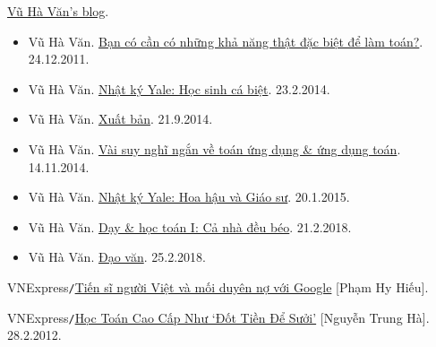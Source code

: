 \documentclass{article}
\numberwithin{equation}{section}
\begin{document}
\begin{thebibliography}{99}
	 \href{https://vuhavan.wordpress.com/}{Vũ Hà Văn's blog}.
	\begin{itemize}
		\item Vũ Hà Văn. \href{https://vuhavan.wordpress.com/2011/12/24/b%e1%ba%a1n-co-c%e1%ba%a7n-co-nh%e1%bb%afng-kh%e1%ba%a3-nang-th%e1%ba%adt-d%e1%ba%b7c-bi%e1%bb%87t-d%e1%bb%83-lam-toan/}{Bạn có cần có những khả năng thật đặc biệt để làm toán?}. 24.12.2011.
		\item Vũ Hà Văn. \href{https://vuhavan.wordpress.com/2014/02/23/nhat-ky-yale-hoc-sinh-ca-biet/}{Nhật ký Yale: Học sinh cá biệt}. 23.2.2014.
		\item Vũ Hà Văn. \href{https://vuhavan.wordpress.com/2014/09/21/xuat-ban/}{Xuất bản}. 21.9.2014.
		\item Vũ Hà Văn. \href{https://vuhavan.wordpress.com/2014/01/14/vai-suy-nghi-ngan-ve-toan-ung-dung-va-ung-dung-toan/}{Vài suy nghĩ ngắn về toán ứng dụng \& ứng dụng toán}. 14.11.2014.
		\item Vũ Hà Văn. \href{https://vuhavan.wordpress.com/2015/01/20/nhat-ky-yale-hoa-hau-va-giao-su/}{Nhật ký Yale: Hoa hậu và Giáo sư}. 20.1.2015.
		\item Vũ Hà Văn. \href{https://vuhavan.wordpress.com/2018/02/21/ca-nha-deu-beo/}{Dạy \& học toán I: Cả nhà đều béo}. 21.2.2018.
		\item Vũ Hà Văn. \href{https://vuhavan.wordpress.com/2018/02/25/dao-van/}{Đạo văn}. 25.2.2018.
	\end{itemize}
	
	 VNExpress\texttt{/}\href{https://vnexpress.net/tien-si-nguoi-viet-va-moi-duyen-no-voi-google-4430615.html}{Tiến sĩ người Việt và mối duyên nợ với Google} [Phạm Hy Hiếu].
	
	 VNExpress\texttt{/}\href{https://vnexpress.net/hoc-toan-cao-cap-nhu-dot-tien-de-suoi-2223794.html}{Học Toán Cao Cấp Như `Đốt Tiền Để Sưởi'} [Nguyễn Trung Hà]. 28.2.2012.
\end{thebibliography}
\end{document}
